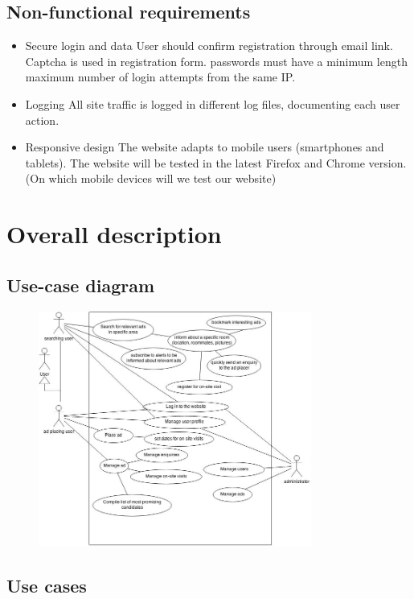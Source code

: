 \documentclass[a4wide]{article}
\begin{document}
\subsection{Non-functional requirements}
\begin{itemize}
\item Secure login and data
    User should confirm registration through email link.
    Captcha is used in registration form.
    passwords must have a minimum length 
    maximum number of  login attempts from the same IP. 
\item Logging
    All site traffic is logged in different log files, documenting each user action.
\item Responsive design
    The website adapts to mobile users (smartphones and tablets).
    The website will be tested in the latest Firefox and Chrome version.
    (On which mobile devices will we test our website)
\end{itemize}
\section{Overall description}
\subsection{Use-case diagram}
\begin{center}
\begin{figure}[H]
\includegraphics[width=0.8\textwidth]{Usecases}
\end{figure}
\end{center}
\subsection{Use cases}
\end{document}

